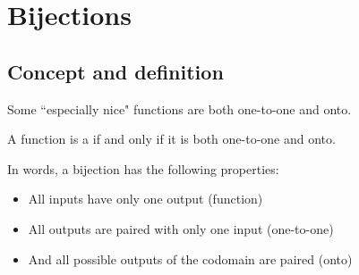 
 
\section{Bijections \quad {}} \label{bijections}

\subsection{Concept and definition}

\medskip\noindent
Some ``especially nice" functions are both one-to-one and onto.

\begin{defn}
 A function is a  if and only if it is both one-to-one and onto.
\end{defn}

In words, a bijection has the following properties:
\begin{itemize}
\item
All inputs have only one output (function)
\item
All outputs are paired with only one input (one-to-one)
\item
And all possible outputs of the codomain are paired (onto)
\end{itemize}



